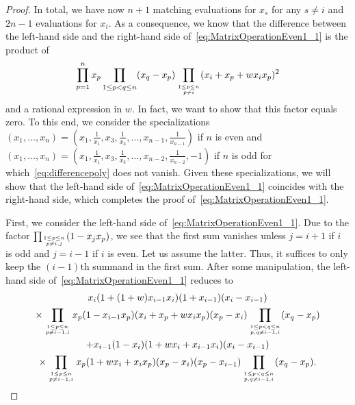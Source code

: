 \documentclass[ALCO, Unicode]{cedram}
\newcommand\myatop[2]{\genfrac{}{}{0pt}{}{#1}{#2}}
\begin{document}
\begin{proof}
		In total, we have now $n+1$ matching evaluations for $x_s$ for any $s\neq i$ and $2n-1$ evaluations for $x_i$. As a consequence, we know that the difference between the left-hand side and the right-hand side of~\eqref{eq:MatrixOperationEven1_1} is the product of
		\begin{equation}\label{eq:differencepoly}
			\prod_{p=1}^{n} x_p \prod_{1 \le p < q \le n} (x_q-x_p) \prod_{\myatop{1 \le p \le n}{p \neq i}} (x_i + x_p + w x_i x_p)^2
		\end{equation}
		and a rational expression in $w$. In fact, we want to show that this factor equals zero. To this end, we consider the specializations $(x_1,\dots,x_n)=(x_1,\frac{1}{x_1},x_3,\frac{1}{x_3},\dots,x_{n-1},\frac{1}{x_{n-1}})$ if $n$ is even and $(x_1,\dots,x_n)=(x_1,\frac{1}{x_1},x_3,\frac{1}{x_3},\dots,x_{n-2},\frac{1}{x_{n-2}},-1)$ if $n$ is odd for which~\eqref{eq:differencepoly} does not vanish. Given these specializations, we will show that the left-hand side of~\eqref{eq:MatrixOperationEven1_1} coincides with the right-hand side, which completes the proof of~\eqref{eq:MatrixOperationEven1_1}.
		
		First, we consider the left-hand side of~\eqref{eq:MatrixOperationEven1_1}. Due to the factor $\prod_{\myatop{1 \le p \le n}{p \neq i,j}} (1-x_j x_p)$, we see that the first sum vanishes unless $j=i+1$ if $i$ is odd and $j=i-1$ if $i$ is even. Let us assume the latter. Thus, it suffices to only keep the $(i-1)$th summand in the first sum. After some manipulation, the left-hand side of~\eqref{eq:MatrixOperationEven1_1} reduces to
		\begin{multline*}
			x_i (1+(1+w) x_{i-1} x_i) (1+x_{i-1}) (x_i-x_{i-1})\\
			\times \prod_{\myatop{1 \le p \le n}{p \neq i-1,i}} x_p (1-x_{i-1} x_p)  (x_i+x_p+w x_i x_p) (x_p - x_i) \prod_{\myatop{1 \le p < q \le n}{p,q \neq i-1,i}} (x_q - x_p) \\
			+ x_{i-1} (1-x_i) (1+w x_i+x_{i-1} x_i) (x_i-x_{i-1})\\
			\times\prod\limits_{\myatop{1 \le p \le n}{p \neq i-1,i}} x_p (1+ w x_i + x_i x_p) (x_p-x_i) (x_p-x_{i-1}) \prod_{\myatop{1 \le p <q \le n}{p,q \neq i-1,i}} (x_q -x_p).
		\end{multline*}
		

\end{proof}
\end{document}
